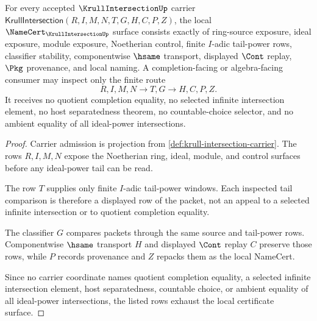 \begin{theorem}
\label{thm:krull-intersection-namecert-obligations}
For every accepted $\KrullIntersectionUp$ carrier $\mathsf{KrullIntersection}(R,I,M,N,T,G,H,C,P,Z)$, the local $\NameCert_{\KrullIntersectionUp}$ surface consists exactly of ring-source exposure, ideal exposure, module exposure, Noetherian control, finite $I$-adic tail-power rows, classifier stability, componentwise $\hsame$ transport, displayed $\Cont$ replay, $\Pkg$ provenance, and local naming. A completion-facing or algebra-facing consumer may inspect only the finite route
$$
R,I,M,N \longrightarrow T,G \longrightarrow H,C,P,Z .
$$
It receives no quotient completion equality, no selected infinite intersection element, no host separatedness theorem, no countable-choice selector, and no ambient equality of all ideal-power intersections.
\end{theorem}
\begin{proof}
Carrier admission is projection from \autoref{def:krull-intersection-carrier}. The rows $R,I,M,N$ expose the Noetherian ring, ideal, module, and control surfaces before any ideal-power tail can be read.

The row $T$ supplies only finite $I$-adic tail-power windows. Each inspected tail comparison is therefore a displayed row of the packet, not an appeal to a selected infinite intersection or to quotient completion equality.

The classifier $G$ compares packets through the same source and tail-power rows. Componentwise $\hsame$ transport $H$ and displayed $\Cont$ replay $C$ preserve those rows, while $P$ records provenance and $Z$ repacks them as the local NameCert.

Since no carrier coordinate names quotient completion equality, a selected infinite intersection element, host separatedness, countable choice, or ambient equality of all ideal-power intersections, the listed rows exhaust the local certificate surface.
\end{proof}



